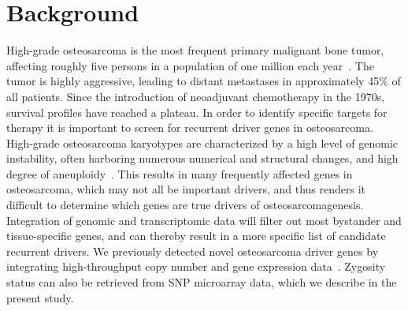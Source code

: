 \section{Background}\label{introduction8}
High-grade osteosarcoma is the most frequent primary malignant bone tumor, affecting roughly five persons in a population of one million each year~\cite{raymond2002conventional}. The tumor is highly aggressive, leading to distant metastases in approximately 45\% of all patients. Since the introduction of neoadjuvant chemotherapy in the 1970s, survival profiles have reached a plateau. In order to identify specific targets for therapy it is important to screen for recurrent driver genes in osteosarcoma. High\hyp{}grade osteosarcoma karyotypes are characterized by a high level of genomic instability, often harboring numerous numerical and structural changes, and high degree of aneuploidy~\cite{cleton2005central}. This results in many frequently affected genes in osteosarcoma, which may not all be important drivers, and thus renders it difficult to determine which genes are true drivers of osteosarcomagenesis. Integration of genomic and transcriptomic data will filter out most bystander and tissue\hyp{}specific genes, and can thereby result in a more specific list of candidate recurrent drivers. We previously detected novel osteosarcoma driver genes by integrating high\hyp{}throughput copy number and gene expression data~\cite{kuijjer2012identification}. Zygosity status can also be retrieved from SNP microarray data, which we describe in the present study.

